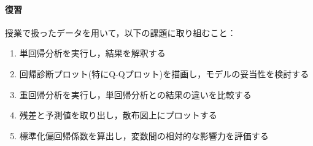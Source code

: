 \paragraph{復習}
授業で扱ったデータを用いて，以下の課題に取り組むこと：

\begin{enumerate}
\item 単回帰分析を実行し，結果を解釈する
\item 回帰診断プロット(特にQ-Qプロット)を描画し，モデルの妥当性を検討する
\item 重回帰分析を実行し，単回帰分析との結果の違いを比較する
\item 残差と予測値を取り出し，散布図上にプロットする
\item 標準化偏回帰係数を算出し，変数間の相対的な影響力を評価する
\end{enumerate}

